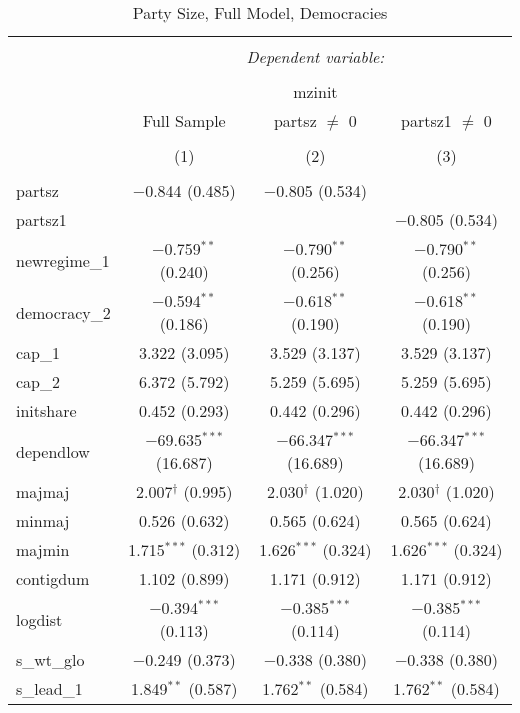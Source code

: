 
\begin{table}[!htbp] \centering 
  \caption{Party Size, Full Model, Democracies} 
  \label{} 
\begin{tabular}{@{\extracolsep{5pt}}lccc} 
\\[-1.8ex]\hline 
\hline \\[-1.8ex] 
 & \multicolumn{3}{c}{\textit{Dependent variable:}} \\ 
\cline{2-4} 
\\[-1.8ex] & \multicolumn{3}{c}{mzinit} \\ 
 & Full Sample & partsz $\neq$ 0 & partsz1 $\neq$ 0 \\ 
\\[-1.8ex] & (1) & (2) & (3)\\ 
\hline \\[-1.8ex] 
 partsz & $-$0.844 (0.485) & $-$0.805 (0.534) &  \\ 
  partsz1 &  &  & $-$0.805 (0.534) \\ 
  newregime\_1 & $-$0.759$^{**}$ (0.240) & $-$0.790$^{**}$ (0.256) & $-$0.790$^{**}$ (0.256) \\ 
  democracy\_2 & $-$0.594$^{**}$ (0.186) & $-$0.618$^{**}$ (0.190) & $-$0.618$^{**}$ (0.190) \\ 
  cap\_1 & 3.322 (3.095) & 3.529 (3.137) & 3.529 (3.137) \\ 
  cap\_2 & 6.372 (5.792) & 5.259 (5.695) & 5.259 (5.695) \\ 
  initshare & 0.452 (0.293) & 0.442 (0.296) & 0.442 (0.296) \\ 
  dependlow & $-$69.635$^{***}$ (16.687) & $-$66.347$^{***}$ (16.689) & $-$66.347$^{***}$ (16.689) \\ 
  majmaj & 2.007$^{\dagger}$ (0.995) & 2.030$^{\dagger}$ (1.020) & 2.030$^{\dagger}$ (1.020) \\ 
  minmaj & 0.526 (0.632) & 0.565 (0.624) & 0.565 (0.624) \\ 
  majmin & 1.715$^{***}$ (0.312) & 1.626$^{***}$ (0.324) & 1.626$^{***}$ (0.324) \\ 
  contigdum & 1.102 (0.899) & 1.171 (0.912) & 1.171 (0.912) \\ 
  logdist & $-$0.394$^{***}$ (0.113) & $-$0.385$^{***}$ (0.114) & $-$0.385$^{***}$ (0.114) \\ 
  s\_wt\_glo & $-$0.249 (0.373) & $-$0.338 (0.380) & $-$0.338 (0.380) \\ 
  s\_lead\_1 & 1.849$^{**}$ (0.587) & 1.762$^{**}$ (0.584) & 1.762$^{**}$ (0.584) \\ 

\end{tabular}
\end{table}
